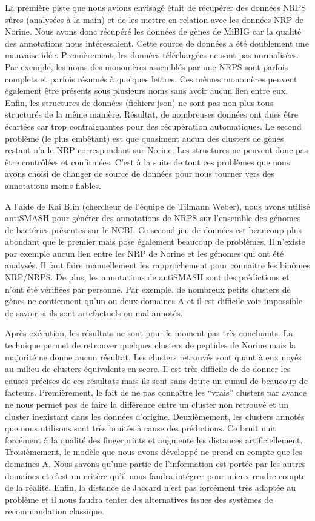 La première piste que nous avions envisagé était de récupérer des données NRPS sûres (analysées à la main) et de les mettre en relation avec les données NRP de Norine.
Nous avons donc récupéré les données de gènes de MiBIG car la qualité des annotations nous intéressaient.
Cette source de données a été doublement une mauvaise idée.
Premièrement, les données téléchargées ne sont pas normalisées.
Par exemple, les noms des monomères assemblés par une NRPS sont parfois complets et parfois résumés à quelques lettres.
Ces mêmes monomères peuvent également être présents sous plusieurs noms sans avoir aucun lien entre eux.
Enfin, les structures de données (fichiers json) ne sont pas non plus tous structurés de la même manière.
Résultat, de nombreuses données ont dues être écartées car trop contraignantes pour des récupération automatiques.
Le second problème (le plus embêtant) est que quasiment aucun des clusters de gènes restant n'a le NRP correspondant sur Norine.
Les structures ne peuvent donc pas être contrôlées et confirmées.
C'est à la suite de tout ces problèmes que nous avons choisi de changer de source de données pour nous tourner vers des annotations moins fiables.

A l'aide de Kai Blin (chercheur de l'équipe de Tilmann Weber), nous avons utilisé antiSMASH pour générer des annotations de NRPS sur l'ensemble des génomes de bactéries présentes sur le NCBI.
Ce second jeu de données est beaucoup plus abondant que le premier mais pose également beaucoup de problèmes.
Il n'existe par exemple aucun lien entre les NRP de Norine et les génomes qui ont été analysés.
Il faut faire manuellement les rapprochement pour connaitre les binômes NRP/NRPS.
De plus, les annotations de antiSMASH sont des prédictions et n'ont été vérifiées par personne.
Par exemple, de nombreux petits clusters de gènes ne contiennent qu'un ou deux domaines A et il est difficile voir impossible de savoir si ils sont artefactuels ou mal annotés.

Après exécution, les résultats ne sont pour le moment pas très concluants.
La technique permet de retrouver quelques clusters de peptides de Norine mais la majorité ne donne aucun résultat.
Les clusters retrouvés sont quant à eux noyés au milieu de clusters équivalents en score.
Il est très difficile de de donner les causes précises de ces résultats mais ils sont sans doute un cumul de beaucoup de facteurs.
Premièrement, le fait de ne pas connaître les ``vrais'' clusters par avance ne nous permet pas de faire la différence entre un cluster non retrouvé et un cluster inexistant dans les données d'origine.
Deuxièmement, les clusters annotés que nous utilisons sont très bruités à cause des prédictions.
Ce bruit nuit forcément à la qualité des fingerprints et augmente les distances artificiellement.
Troisièmement, le modèle que nous avons développé ne prend en compte que les domaines A.
Nous savons qu'une partie de l'information est portée par les autres domaines et c'est un critère qu'il nous faudra intégrer pour mieux rendre compte de la réalité.
Enfin, la distance de Jaccard n'est pas forcément très adaptée au problème et il nous faudra tenter des alternatives issues des systèmes de recommandation classique.



